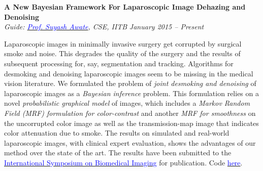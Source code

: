 \documentclass[margin,line]{res}
\newenvironment{list1}{
  \begin{list}{\ding{113}}{%
      \setlength{\itemsep}{0in}
      \setlength{\parsep}{0in} \setlength{\parskip}{0in}
      \setlength{\topsep}{0in} \setlength{\partopsep}{0in} 
      \setlength{\leftmargin}{0.17in}}}{\end{list}}
\begin{document}
\begin{resume}
{\bf A New Bayesian Framework For Laparoscopic Image Dehazing and Denoising} \\
{\em Guide: \href{https://www.cse.iitb.ac.in/~suyash}{\textcolor{blue}{Prof. Suyash Awate}}, CSE, IITB} \hfill {\it January 2015 -- Present} \\
\vspace*{-.13in}
\begin{list1}
\item[]
Laparoscopic images in minimally invasive surgery get corrupted by surgical smoke and noise. This degrades the quality of the surgery and the results of subsequent processing for, say, segmentation and tracking. Algorithms for desmoking and denoising laparoscopic images seem to be missing in the medical vision literature. We formulated the problem of \textit{joint desmoking and denoising} of laparoscopic images as a \textit{Bayesian inference} problem. This formulation relies on a novel \textit{probabilistic graphical model} of images, which includes a \textit{Markov Random Field (MRF) formulation for color-contrast} and another \textit{MRF for smoothness} on the uncorrupted color image as well as the transmission-map image that indicates color attenuation due to smoke. The results on simulated and real-world laparoscopic images, with clinical expert evaluation, shows the advantages of our method over the state of the art. The results have been submitted to the \href{http://biomedicalimaging.org/2016/}{\textcolor{blue} {International Symposium on Biomedical Imaging}} for publication. Code \href{https://github.com/alankarkotwal/lap-dehazing}{\textcolor{blue} {here}}.
\end{list1}


\end{resume}
\end{document}
